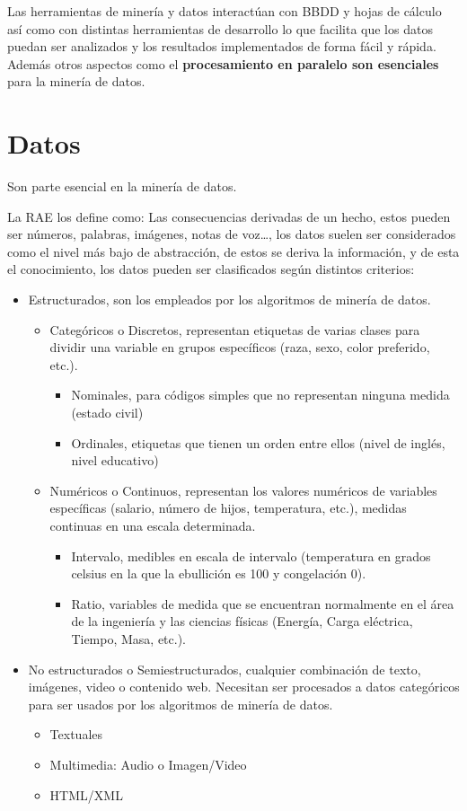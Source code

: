 \documentclass[12pt, twoside, openright]{report} %
\begin{document}
Las herramientas de minería y datos interactúan con BBDD y hojas de cálculo así como con distintas herramientas de desarrollo lo que facilita que los datos puedan ser analizados y los resultados implementados de forma fácil y rápida. Además otros aspectos como el \textbf{procesamiento en paralelo son esenciales} para la minería de datos.

\section{Datos}
Son parte esencial en la minería de datos.

La RAE los define como: Las consecuencias derivadas de un hecho, estos pueden ser números, palabras, imágenes, notas de voz…, los datos suelen ser considerados como el nivel más bajo de abstracción, de estos se deriva la información, y de esta el conocimiento, los datos pueden ser clasificados según distintos criterios:
\begin{itemize}
	\item Estructurados, son los empleados por los algoritmos de minería de datos.
	      \begin{itemize}
		      \item Categóricos o Discretos, representan etiquetas de varias clases para dividir una variable en grupos específicos (raza, sexo, color preferido, etc.).
		            \begin{itemize}
			            \item Nominales, para códigos simples que no representan ninguna medida (estado civil)
			            \item Ordinales, etiquetas que tienen un orden entre ellos (nivel de inglés, nivel educativo)
		            \end{itemize}
		      \item Numéricos o Continuos, representan los valores numéricos de variables específicas (salario, número de hijos, temperatura, etc.), medidas continuas en una escala determinada.
		            \begin{itemize}
			            \item Intervalo, medibles en escala de intervalo (temperatura en grados celsius en la que la ebullición es 100 y congelación 0).
			            \item Ratio, variables de medida que se encuentran normalmente en el área de la ingeniería y las ciencias físicas (Energía, Carga eléctrica, Tiempo, Masa, etc.).
		            \end{itemize}
	      \end{itemize}
	\item No estructurados o Semiestructurados, cualquier combinación de texto, imágenes, video o contenido web. Necesitan ser procesados a datos categóricos para ser usados por los algoritmos de minería de datos.
	      \begin{itemize}
		      \item Textuales
		      \item Multimedia: Audio o Imagen/Video
		      \item HTML/XML
	      \end{itemize}
\end{itemize}
\end{document}
